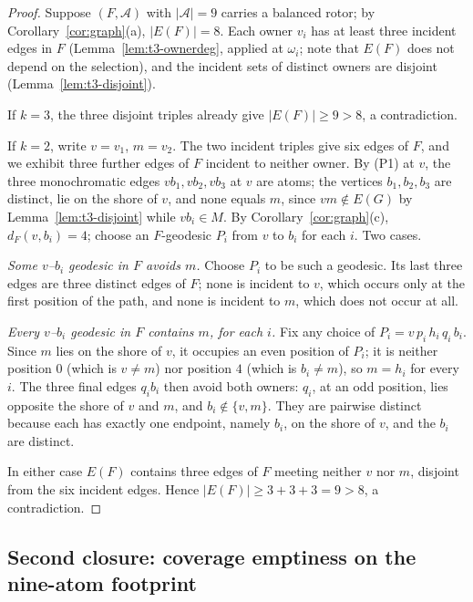 \begin{proof}
Suppose \((F,\mathcal A)\) with \(|\mathcal A|=9\) carries a balanced
rotor; by Corollary~\ref{cor:graph}(a), \(|E(F)|=8\). Each owner
\(v_i\) has at least three incident edges in \(F\)
(Lemma~\ref{lem:t3-ownerdeg}, applied at \(\omega_i\); note that
\(E(F)\) does not depend on the selection), and the incident sets of
distinct owners are disjoint (Lemma~\ref{lem:t3-disjoint}).

If \(k=3\), the three disjoint triples already give
\(|E(F)|\ge9>8\), a contradiction.

If \(k=2\), write \(v=v_1\), \(m=v_2\). The two incident triples give
six edges of \(F\), and we exhibit three further edges of \(F\)
incident to neither owner. By (P1) at \(v\), the three monochromatic
edges \(vb_1,vb_2,vb_3\) at \(v\) are atoms; the vertices
\(b_1,b_2,b_3\) are distinct, lie on the shore of \(v\), and none
equals \(m\), since \(vm\notin E(G)\) by
Lemma~\ref{lem:t3-disjoint} while \(vb_i\in M\). By
Corollary~\ref{cor:graph}(c), \(d_F(v,b_i)=4\); choose an
\(F\)-geodesic \(P_i\) from \(v\) to \(b_i\) for each \(i\). Two cases.

\emph{Some \(v\)--\(b_i\) geodesic in \(F\) avoids \(m\).} Choose
\(P_i\) to be such a geodesic. Its last three edges are three distinct
edges of \(F\); none is incident to \(v\), which occurs only at the
first position of the path, and none is incident to \(m\), which does
not occur at all.

\emph{Every \(v\)--\(b_i\) geodesic in \(F\) contains \(m\), for each
\(i\).} Fix any choice of \(P_i=v\,p_i\,h_i\,q_i\,b_i\). Since \(m\)
lies on the shore of \(v\), it occupies an even position of \(P_i\);
it is neither position \(0\) (which is \(v\ne m\)) nor position \(4\)
(which is \(b_i\ne m\)), so \(m=h_i\) for every \(i\). The three final
edges \(q_ib_i\) then avoid both owners: \(q_i\), at an odd position,
lies opposite the shore of \(v\) and \(m\), and \(b_i\notin\{v,m\}\).
They are pairwise distinct because each has exactly one endpoint,
namely \(b_i\), on the shore of \(v\), and the \(b_i\) are distinct.

In either case \(E(F)\) contains three edges of \(F\) meeting neither
\(v\) nor \(m\), disjoint from the six incident edges. Hence
\(|E(F)|\ge3+3+3=9>8\), a contradiction.
\end{proof}

\subsection{Second closure: coverage emptiness on the nine-atom
footprint}

